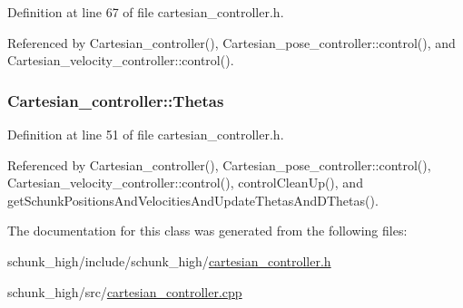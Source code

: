 Definition at line 67 of file cartesian\-\_\-controller.\-h.



Referenced by Cartesian\-\_\-controller(), Cartesian\-\_\-pose\-\_\-controller\-::control(), and Cartesian\-\_\-velocity\-\_\-controller\-::control().

\hypertarget{classCartesian__controller_a0a0f818dad601cd9e3e26cb6959b8eb6}{
\subsubsection[{Thetas}]{ Cartesian\-\_\-controller\-::\-Thetas\hspace{0.3cm}{\ttfamily [protected]}}}\label{classCartesian__controller_a0a0f818dad601cd9e3e26cb6959b8eb6}


Definition at line 51 of file cartesian\-\_\-controller.\-h.



Referenced by Cartesian\-\_\-controller(), Cartesian\-\_\-pose\-\_\-controller\-::control(), Cartesian\-\_\-velocity\-\_\-controller\-::control(), control\-Clean\-Up(), and get\-Schunk\-Positions\-And\-Velocities\-And\-Update\-Thetas\-And\-D\-Thetas().



The documentation for this class was generated from the following files\-:\begin{DoxyCompactItemize}
\item 
schunk\-\_\-high/include/schunk\-\_\-high/\hyperlink{cartesian__controller_8h}{cartesian\-\_\-controller.\-h}\item 
schunk\-\_\-high/src/\hyperlink{cartesian__controller_8cpp}{cartesian\-\_\-controller.\-cpp}\end{DoxyCompactItemize}
